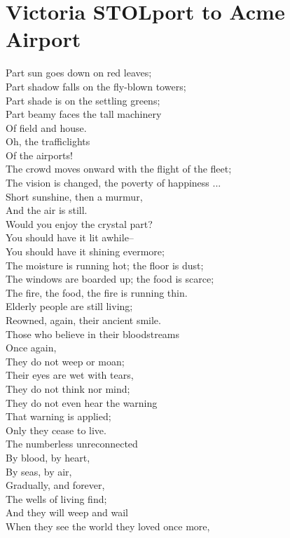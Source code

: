 \documentclass[smalldemyvopaper,11pt,twoside,onecolumn,openright,extrafontsizes]{memoir}
\begin{document}
\chapter{Victoria STOLport to Acme Airport}
Part sun goes down on red leaves;
\\Part shadow falls on the fly-blown towers;
\\Part shade is on the settling greens;
\\Part beamy faces the tall machinery
\\Of field and house.
\\Oh, the trafficlights
\\Of the airports!
\\The crowd moves onward with the flight of the fleet;
\\The vision is changed, the poverty of happiness ...
\\Short sunshine, then a murmur,
\\And the air is still.
\\Would you enjoy the crystal part?
\\You should have it lit awhile--
\\You should have it shining evermore;
\\The moisture is running hot; the floor is dust;
\\The windows are boarded up; the food is scarce;
\\The fire, the food, the fire is running thin.
\\Elderly people are still living;
\\Reowned, again, their ancient smile.
\\Those who believe in their bloodstreams
\\Once again,
\\They do not weep or moan;
\\Their eyes are wet with tears,
\\They do not think nor mind;
\\They do not even hear the warning
\\That warning is applied;
\\Only they cease to live.
\\The numberless unreconnected
\\By blood, by heart,
\\By seas, by air,
\\Gradually, and forever,
\\The wells of living find;
\\And they will weep and wail
\\When they see the world they loved once more,
\end{document}
